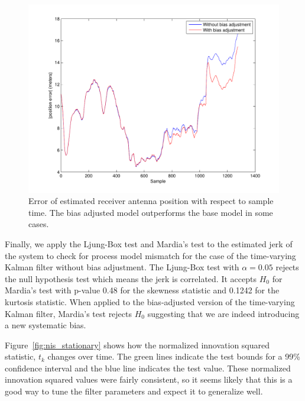 \begin{figure}
\includegraphics[width=\columnwidth]{error_stationary}
\caption{Error of estimated receiver antenna position with respect to sample time.  The bias adjusted model outperforms the base model in some cases.}
\label{fig:stationary_error}
\end{figure}

Finally, we apply the Ljung-Box test and Mardia's test to the estimated jerk of the system to check for process model mismatch for the case of the time-varying Kalman filter without bias adjustment.  The Ljung-Box test with $\alpha = 0.05$ rejects the null hypothesis test which means the jerk is correlated.  It accepts $H_0$ for Mardia's test with p-value 0.48 for the skewness statistic and 0.1242 for the kurtosis statistic.  When applied to the bias-adjusted version of the time-varying Kalman filter, Mardia's test rejects $H_0$ suggesting that we are indeed introducing a new systematic bias.

Figure~\ref{fig:nis_stationary} shows how the normalized innovation squared statistic, $t_k$ changes over time.  The green lines indicate the test bounds for a 99\% confidence interval and the blue line indicates the test value.  These normalized innovation squared values were fairly consistent, so it seems likely that this is a good way to tune the filter parameters and expect it to generalize well.

